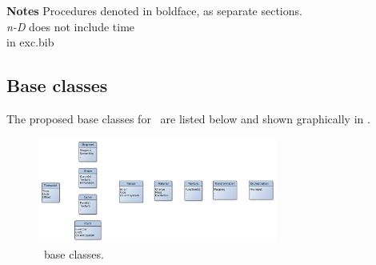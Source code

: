 \textbf{Notes} Procedures denoted in boldface, as separate sections.\\
\emph{n-D} does not include time\\
\cite{sciplan} in exc.bib

\subsection{Base classes}\label{sec:base-classes}
The proposed base classes for \nep\ are listed below and shown graphically in .
\begin{figure}
\centerline{\includegraphics[width=0.7\textwidth]{./pics/baseclasses.png}}
\caption{\nep \ base classes.
\label{fig:baseclasses}}
\end{figure}

